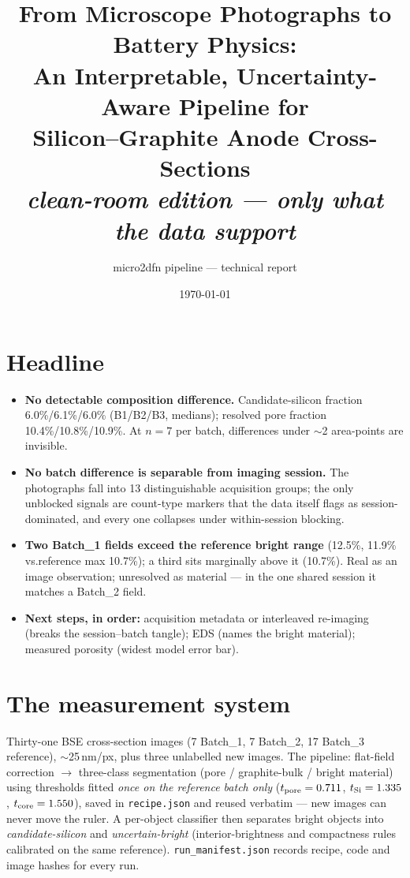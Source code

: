 \documentclass[10pt,a4paper]{article}
\title{From Microscope Photographs to Battery Physics:\\
An Interpretable, Uncertainty-Aware Pipeline for\\
Silicon--Graphite Anode Cross-Sections\\[4pt]
{\large\itshape clean-room edition --- only what the data support}}
\author{micro2dfn pipeline --- technical report}
\date{\today}
\begin{document}
\maketitle

\section*{Headline}
\begin{itemize}\itemsep2pt
\item \textbf{No detectable composition difference.} Candidate-silicon
fraction 6.0\%/6.1\%/6.0\%
(B1/B2/B3, medians); resolved pore fraction 10.4\%/10.8\%/10.9\%.
At $n=7$ per batch, differences under $\sim$2 area-points are invisible.
\item \textbf{No batch difference is separable from imaging session.}
The photographs fall into 13 distinguishable acquisition groups;
the only unblocked signals are count-type markers that the data itself
flags as session-dominated, and every one collapses under within-session
blocking.
\item \textbf{Two Batch\_1 fields exceed the reference bright range}
(12.5\%, 11.9\% vs.reference max 10.7\%); a third sits marginally above
it (10.7\%). Real as an image
observation; unresolved as material --- in the one shared session it
matches a Batch\_2 field.
\item \textbf{Next steps, in order:} acquisition metadata or interleaved
re-imaging (breaks the session--batch tangle); EDS (names the bright
material); measured porosity (widest model error bar).
\end{itemize}

\tableofcontents

\section{The measurement system}
\label{sec:system}

Thirty-one BSE cross-section images (7 Batch\_1, 7 Batch\_2, 17 Batch\_3
reference), $\sim$25\,nm/px, plus three unlabelled new images. The
pipeline: flat-field correction $\rightarrow$ three-class segmentation
(pore / graphite-bulk / bright material) using thresholds fitted
\emph{once on the reference batch only} ($t_{\rm pore}=0.711$,
$t_{\rm Si}=1.335$, $t_{\rm core}=1.550$), saved in \texttt{recipe.json}
and reused verbatim --- new images can never move the ruler. A
per-object classifier then separates bright objects into
\emph{candidate-silicon} and \emph{uncertain-bright} (interior-brightness
and compactness rules calibrated on the same reference).
\texttt{run\_manifest.json} records recipe, code and image hashes for
every run.
\end{document}
